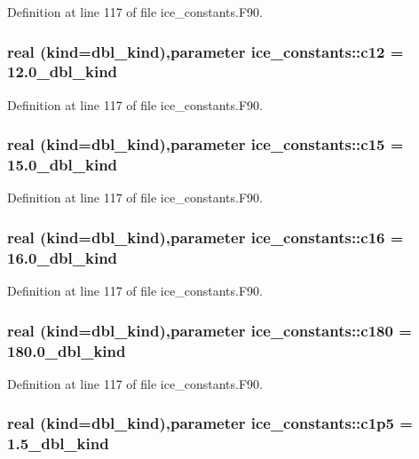 Definition at line 117 of file ice\_\-constants.F90.\hypertarget{namespaceice__constants_ad58b4990ce1a83ae0c0ca55a61e8ed1e}{
\subsubsection[{c12}]{\setlength{\rightskip}{0pt plus 5cm}real (kind=dbl\_\-kind),parameter {\bf ice\_\-constants::c12} = 12.0\_\-dbl\_\-kind}}
\label{namespaceice__constants_ad58b4990ce1a83ae0c0ca55a61e8ed1e}


Definition at line 117 of file ice\_\-constants.F90.\hypertarget{namespaceice__constants_a7ea763e48f3b0d07e97e411c1abd6da1}{
\subsubsection[{c15}]{\setlength{\rightskip}{0pt plus 5cm}real (kind=dbl\_\-kind),parameter {\bf ice\_\-constants::c15} = 15.0\_\-dbl\_\-kind}}
\label{namespaceice__constants_a7ea763e48f3b0d07e97e411c1abd6da1}


Definition at line 117 of file ice\_\-constants.F90.\hypertarget{namespaceice__constants_aaa41418681ab232e158cb3a792321df8}{
\subsubsection[{c16}]{\setlength{\rightskip}{0pt plus 5cm}real (kind=dbl\_\-kind),parameter {\bf ice\_\-constants::c16} = 16.0\_\-dbl\_\-kind}}
\label{namespaceice__constants_aaa41418681ab232e158cb3a792321df8}


Definition at line 117 of file ice\_\-constants.F90.\hypertarget{namespaceice__constants_a4090f4acc886fcf5ff13e21846607eca}{
\subsubsection[{c180}]{\setlength{\rightskip}{0pt plus 5cm}real (kind=dbl\_\-kind),parameter {\bf ice\_\-constants::c180} = 180.0\_\-dbl\_\-kind}}
\label{namespaceice__constants_a4090f4acc886fcf5ff13e21846607eca}


Definition at line 117 of file ice\_\-constants.F90.\hypertarget{namespaceice__constants_afa5b0477438de8f4ade05dd69ff9d8bb}{
\subsubsection[{c1p5}]{\setlength{\rightskip}{0pt plus 5cm}real (kind=dbl\_\-kind),parameter {\bf ice\_\-constants::c1p5} = 1.5\_\-dbl\_\-kind}}
\label{namespaceice__constants_afa5b0477438de8f4ade05dd69ff9d8bb}


